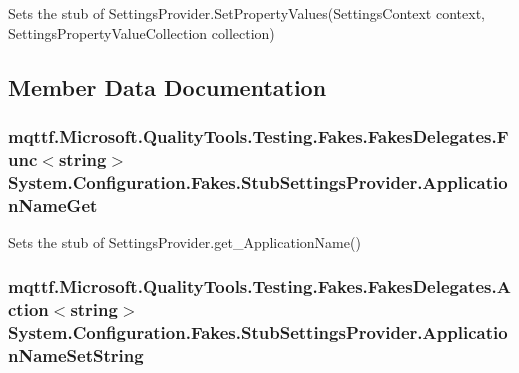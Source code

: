 Sets the stub of Settings\-Provider.\-Set\-Property\-Values(\-Settings\-Context context, Settings\-Property\-Value\-Collection collection)



\subsection{Member Data Documentation}
\hypertarget{class_system_1_1_configuration_1_1_fakes_1_1_stub_settings_provider_a66d06fd77aff8f0d2276c55386d182df}{
\subsubsection[{Application\-Name\-Get}]{\setlength{\rightskip}{0pt plus 5cm}mqttf.\-Microsoft.\-Quality\-Tools.\-Testing.\-Fakes.\-Fakes\-Delegates.\-Func$<$string$>$ System.\-Configuration.\-Fakes.\-Stub\-Settings\-Provider.\-Application\-Name\-Get}}\label{class_system_1_1_configuration_1_1_fakes_1_1_stub_settings_provider_a66d06fd77aff8f0d2276c55386d182df}


Sets the stub of Settings\-Provider.\-get\-\_\-\-Application\-Name()

\hypertarget{class_system_1_1_configuration_1_1_fakes_1_1_stub_settings_provider_a2ca696950287eeadc1b55264dded6cd5}{
\subsubsection[{Application\-Name\-Set\-String}]{\setlength{\rightskip}{0pt plus 5cm}mqttf.\-Microsoft.\-Quality\-Tools.\-Testing.\-Fakes.\-Fakes\-Delegates.\-Action$<$string$>$ System.\-Configuration.\-Fakes.\-Stub\-Settings\-Provider.\-Application\-Name\-Set\-String}}\label{class_system_1_1_configuration_1_1_fakes_1_1_stub_settings_provider_a2ca696950287eeadc1b55264dded6cd5}


